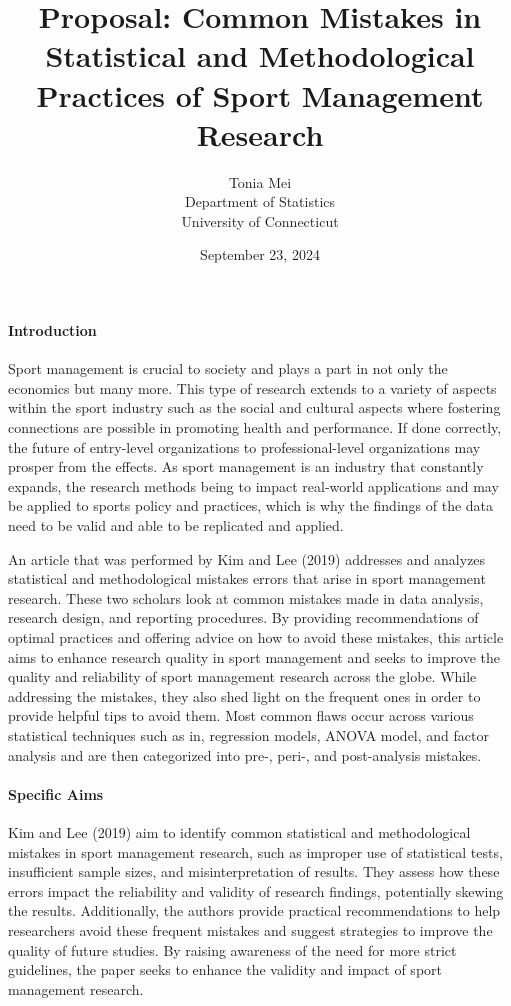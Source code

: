 \documentclass[12pt]{article}
\title{Proposal: Common Mistakes in Statistical and Methodological Practices of Sport Management Research}
\author{Tonia Mei\\
  Department of Statistics\\
  University of Connecticut
}
\date{September 23, 2024}
\begin{document}
\maketitle


\paragraph{Introduction}
Sport management is crucial to society and plays a part in not only the economics but many more. This type of research extends to a variety of aspects within the sport industry such as the social and cultural aspects where fostering connections are possible in promoting health and performance. If done correctly, the future of entry-level organizations to professional-level organizations may prosper from the effects. As sport management is an industry that constantly expands, the research methods being to impact real-world applications and may be applied to sports policy and practices, which is why the findings of the data need to be valid and able to be replicated and applied.

An article that was performed by Kim and Lee (2019) addresses and analyzes statistical and methodological mistakes errors that arise in sport management research. These two scholars look at common mistakes made in data analysis, research design, and reporting procedures. By providing recommendations of optimal practices and offering advice on how to avoid these mistakes, this article aims to enhance research quality in sport management and seeks to improve the quality and reliability of sport management research across the globe. While addressing the mistakes, they also shed light on the frequent ones in order to provide helpful tips to avoid them. Most common flaws occur across various statistical techniques such as in, regression models, ANOVA model, and factor analysis and are then categorized into pre-, peri-, and post-analysis mistakes.


\paragraph{Specific Aims}
Kim and Lee (2019) aim to identify common statistical and methodological mistakes in sport management research, such as improper use of statistical tests, insufficient sample sizes, and misinterpretation of results. They assess how these errors impact the reliability and validity of research findings, potentially skewing the results. Additionally, the authors provide practical recommendations to help researchers avoid these frequent mistakes and suggest strategies to improve the quality of future studies. By raising awareness of the need for more strict guidelines, the paper seeks to enhance the validity and impact of sport management research.
\end{document}

